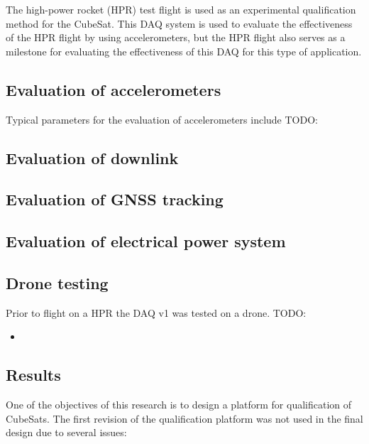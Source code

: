 \documentclass{report}
\begin{document}
The high-power rocket (HPR) test flight is used as an experimental qualification method for the CubeSat. This DAQ system is used to evaluate the effectiveness of the HPR flight by using accelerometers, but the HPR flight also serves as a milestone for evaluating the effectiveness of this DAQ for this type of application.

\subsection{Evaluation of accelerometers}

Typical parameters for the evaluation of accelerometers include TODO:

\subsection{Evaluation of downlink}

\subsection{Evaluation of GNSS tracking}

\subsection{Evaluation of electrical power system}

\subsection{Drone testing}
Prior to flight on a HPR the DAQ v1 was tested on a drone.
TODO:

\begin{itemize}
  \item
\end{itemize}

\subsection{Results}

One of the objectives of this research is to design a platform for qualification of CubeSats. The first revision of the qualification platform was not used in the final design due to several issues:
\end{document}
